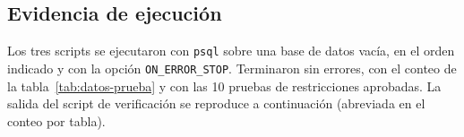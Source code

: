 \documentclass[11pt,a4paper]{article}
\begin{document}
\subsection{Evidencia de ejecución}

Los tres scripts se ejecutaron con \texttt{psql} sobre una base de datos vacía, en el orden
indicado y con la opción \texttt{ON\_ERROR\_STOP}. Terminaron sin errores, con el conteo de la
tabla~\ref{tab:datos-prueba} y con las 10 pruebas de restricciones aprobadas. La salida del
script de verificación se reproduce a continuación (abreviada en el conteo por tabla).

\end{document}
